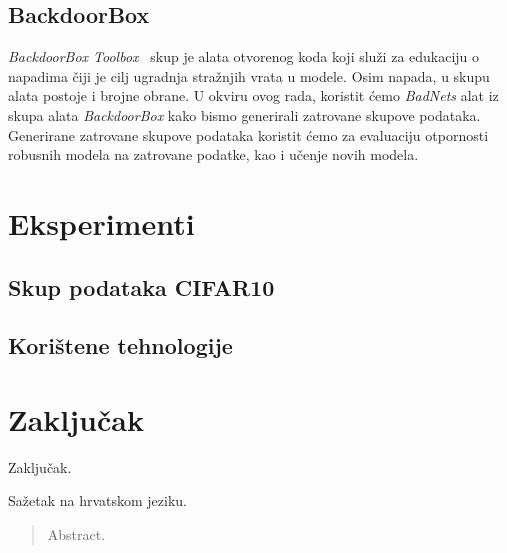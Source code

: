 \documentclass[times, utf8, zavrsni, numeric]{fer}
\begin{document}
\section{BackdoorBox}

\textit{BackdoorBox Toolbox}~\cite{li2023backdoorbox} skup je alata otvorenog koda koji služi za edukaciju o napadima čiji je cilj ugradnja stražnjih vrata u modele.
Osim napada, u skupu alata postoje i brojne obrane. U okviru ovog rada, koristit ćemo \textit{BadNets} alat iz skupa alata \textit{BackdoorBox} kako bismo generirali zatrovane skupove podataka.
Generirane zatrovane skupove podataka koristit ćemo za evaluaciju otpornosti robusnih modela na zatrovane podatke, kao i učenje novih modela.

\chapter{Eksperimenti}

\section{Skup podataka CIFAR10}

\section{Korištene tehnologije}

\chapter{Zaključak}
Zaključak.




\begin{sazetak}
Sažetak na hrvatskom jeziku.

\end{sazetak}

\begin{abstract}
Abstract.

\end{abstract}
\end{document}
